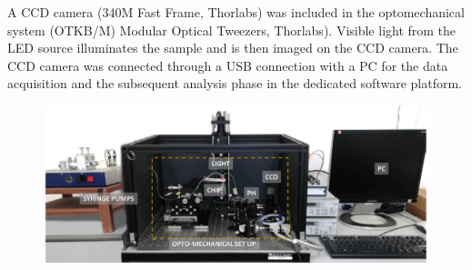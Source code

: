 \documentclass[journal]{IEEEtran}
\theoremstyle{definition}
\theoremstyle{remark}
\begin{document}
A CCD camera (340M Fast Frame, Thorlabs) was included in the optomechanical system (OTKB/M) Modular Optical Tweezers, Thorlabs). Visible light from the LED source illuminates the sample and is then imaged
on the CCD camera.
The CCD camera was connected through a USB connection with a PC for the data acquisition and the subsequent analysis phase in the dedicated software platform.


\begin{figure}[t]
	\centering
	\includegraphics[width=1\columnwidth]{images/setup}
\end{figure}
\end{document}
